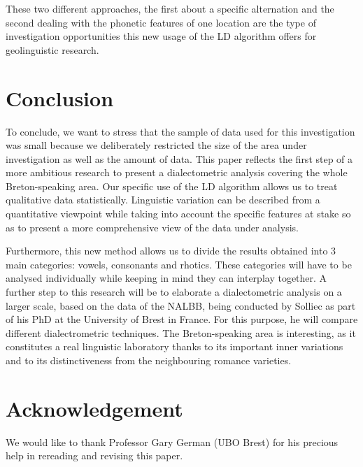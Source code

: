\documentclass[output=paper]{LSP/langsci}
\begin{document}
These two different approaches, the first about a specific alternation and the second dealing with the phonetic features of one location are the type of investigation opportunities this new usage of the LD algorithm offers for geolinguistic research. 

\section{Conclusion}

To conclude, we want to stress that the sample of data used for this investigation was small because we deliberately restricted the size of the area under investigation as well as the amount of data. This paper reflects the first step of a more ambitious research to present a dialectometric analysis covering the whole Breton-speaking area. Our specific use of the LD algorithm allows us to treat qualitative data statistically. Linguistic variation can be described from a quantitative viewpoint while taking into account the specific features at stake so as to present a more comprehensive view of the data under analysis.

Furthermore, this new method allows us to divide the results obtained into 3 main categories: vowels, consonants and rhotics. These categories will have to be analysed individually while keeping in mind they can interplay together. A further step to this research will be to elaborate a dialectometric analysis on a larger scale, based on the data of the NALBB, being conducted by Solliec as part of his PhD at the University of Brest in France. For this purpose, he will compare different dialectrometric techniques. The Breton-speaking area is interesting, as it constitutes a real linguistic laboratory thanks to its important inner variations and to its distinctiveness from the neighbouring romance varieties.

\section*{Acknowledgement}
We would like to thank Professor Gary German (UBO Brest) for his precious help in rereading and revising this paper.

\printbibliography[heading=subbibliography,notkeyword=this]
\end{document}
